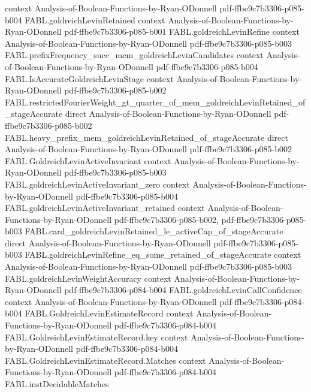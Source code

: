 \begin{theorem}
  {context}
  {Analysis-of-Boolean-Functions-by-Ryan-ODonnell}
  {pdf-ffbe9c7b3306-p085-b004}
\proofstep
  {FABL.goldreichLevinRetained}
  {context}
  {Analysis-of-Boolean-Functions-by-Ryan-ODonnell}
  {pdf-ffbe9c7b3306-p085-b001}
\proofstep
  {FABL.goldreichLevinRefine}
  {context}
  {Analysis-of-Boolean-Functions-by-Ryan-ODonnell}
  {pdf-ffbe9c7b3306-p085-b003}
\proofstep
  {FABL.prefixFrequency_succ_mem_goldreichLevinCandidates}
  {context}
  {Analysis-of-Boolean-Functions-by-Ryan-ODonnell}
  {pdf-ffbe9c7b3306-p085-b004}
\proofstep
  {FABL.IsAccurateGoldreichLevinStage}
  {context}
  {Analysis-of-Boolean-Functions-by-Ryan-ODonnell}
  {pdf-ffbe9c7b3306-p085-b002}
\proofstep
  {FABL.restrictedFourierWeight_gt_quarter_of_mem_goldreichLevinRetained_of_stageAccurate}
  {direct}
  {Analysis-of-Boolean-Functions-by-Ryan-ODonnell}
  {pdf-ffbe9c7b3306-p085-b002}
\proofstep
  {FABL.heavy_prefix_mem_goldreichLevinRetained_of_stageAccurate}
  {direct}
  {Analysis-of-Boolean-Functions-by-Ryan-ODonnell}
  {pdf-ffbe9c7b3306-p085-b002}
\proofstep
  {FABL.GoldreichLevinActiveInvariant}
  {context}
  {Analysis-of-Boolean-Functions-by-Ryan-ODonnell}
  {pdf-ffbe9c7b3306-p085-b003}
\proofstep
  {FABL.goldreichLevinActiveInvariant_zero}
  {context}
  {Analysis-of-Boolean-Functions-by-Ryan-ODonnell}
  {pdf-ffbe9c7b3306-p085-b004}
\proofstep
  {FABL.goldreichLevinActiveInvariant_retained}
  {context}
  {Analysis-of-Boolean-Functions-by-Ryan-ODonnell}
  {pdf-ffbe9c7b3306-p085-b002,
    pdf-ffbe9c7b3306-p085-b003}
\proofstep
  {FABL.card_goldreichLevinRetained_le_activeCap_of_stageAccurate}
  {direct}
  {Analysis-of-Boolean-Functions-by-Ryan-ODonnell}
  {pdf-ffbe9c7b3306-p085-b003}
\proofstep
  {FABL.goldreichLevinRefine_eq_some_retained_of_stageAccurate}
  {context}
  {Analysis-of-Boolean-Functions-by-Ryan-ODonnell}
  {pdf-ffbe9c7b3306-p085-b003}
\proofstep
  {FABL.goldreichLevinWeightAccuracy}
  {context}
  {Analysis-of-Boolean-Functions-by-Ryan-ODonnell}
  {pdf-ffbe9c7b3306-p084-b004}
\proofstep
  {FABL.goldreichLevinCallConfidence}
  {context}
  {Analysis-of-Boolean-Functions-by-Ryan-ODonnell}
  {pdf-ffbe9c7b3306-p084-b004}
\proofstep
  {FABL.GoldreichLevinEstimateRecord}
  {context}
  {Analysis-of-Boolean-Functions-by-Ryan-ODonnell}
  {pdf-ffbe9c7b3306-p084-b004}
\proofstep
  {FABL.GoldreichLevinEstimateRecord.key}
  {context}
  {Analysis-of-Boolean-Functions-by-Ryan-ODonnell}
  {pdf-ffbe9c7b3306-p084-b004}
\proofstep
  {FABL.GoldreichLevinEstimateRecord.Matches}
  {context}
  {Analysis-of-Boolean-Functions-by-Ryan-ODonnell}
  {pdf-ffbe9c7b3306-p084-b004}
\proofstep
  {FABL.instDecidableMatches}

\end{theorem}
